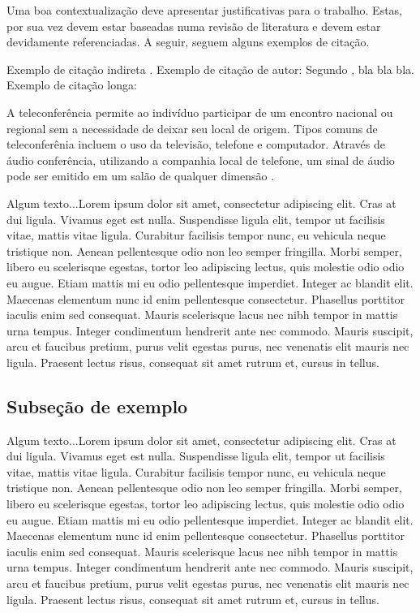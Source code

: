 \documentclass[quali]{mpit}
\begin{document}
Uma boa contextualização deve apresentar justificativas para o trabalho. Estas, por sua vez devem estar baseadas numa revisão de literatura e devem estar devidamente referenciadas. A seguir, seguem alguns exemplos de citação.

Exemplo de citação indireta \cite{tolvanenKelly08}.
Exemplo de citação de autor: Segundo , bla bla bla.
Exemplo de citação longa:

\begin{citacao}
A teleconferência permite ao indivíduo participar de um encontro
nacional ou regional sem a necessidade de deixar seu local de
origem. Tipos comuns de teleconferênia incluem o uso da televisão,
telefone e computador. Através de áudio conferência, utilizando
a companhia local de telefone, um sinal de áudio pode ser emitido
em um salão de qualquer dimensão \cite[p. 181]{weberZhang96}.
\end{citacao}

Algum texto...Lorem ipsum dolor sit amet, consectetur adipiscing elit. Cras at dui ligula. Vivamus eget est nulla. Suspendisse ligula elit, tempor ut facilisis vitae, mattis vitae ligula. Curabitur facilisis tempor nunc, eu vehicula neque tristique non. Aenean pellentesque odio non leo semper fringilla. Morbi semper, libero eu scelerisque egestas, tortor leo adipiscing lectus, quis molestie odio odio eu augue. Etiam mattis mi eu odio pellentesque imperdiet. Integer ac blandit elit. Maecenas elementum nunc id enim pellentesque consectetur. Phasellus porttitor iaculis enim sed consequat. Mauris scelerisque lacus nec nibh tempor in mattis urna tempus. Integer condimentum hendrerit ante nec commodo. Mauris suscipit, arcu et faucibus pretium, purus velit egestas purus, nec venenatis elit mauris nec ligula. Praesent lectus risus, consequat sit amet rutrum et, cursus in tellus.

\subsection{Subseção de exemplo}

Algum texto...Lorem ipsum dolor sit amet, consectetur adipiscing elit. Cras at dui ligula. Vivamus eget est nulla. Suspendisse ligula elit, tempor ut facilisis vitae, mattis vitae ligula. Curabitur facilisis tempor nunc, eu vehicula neque tristique non. Aenean pellentesque odio non leo semper fringilla. Morbi semper, libero eu scelerisque egestas, tortor leo adipiscing lectus, quis molestie odio odio eu augue. Etiam mattis mi eu odio pellentesque imperdiet. Integer ac blandit elit. Maecenas elementum nunc id enim pellentesque consectetur. Phasellus porttitor iaculis enim sed consequat. Mauris scelerisque lacus nec nibh tempor in mattis urna tempus. Integer condimentum hendrerit ante nec commodo. Mauris suscipit, arcu et faucibus pretium, purus velit egestas purus, nec venenatis elit mauris nec ligula. Praesent lectus risus, consequat sit amet rutrum et, cursus in tellus.
\end{document}
